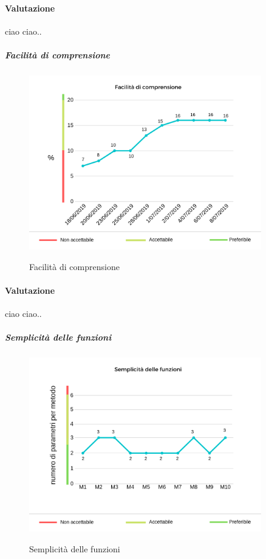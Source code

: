 	\paragraph*{Valutazione} ciao ciao..
	\pagebreak
	\subparagraph{Facilità di comprensione}
	\begin{center}
		\begin{figure}[h] 
			\centering 
			\includegraphics[width=0.90\textwidth]{res/images/new/facilitaComprensione.png}\\
			\caption{Facilità di comprensione}
		\end{figure}
	\end{center}
	\paragraph*{Valutazione} ciao ciao..
	\pagebreak
	\subparagraph{Semplicità delle funzioni}
	\begin{center}
		\begin{figure}[h] 
			\centering 
			\includegraphics[width=0.90\textwidth]{res/images/new/semplicitaFunzioni.png}\\
			\caption{Semplicità delle funzioni}
		\end{figure}
	\end{center}
